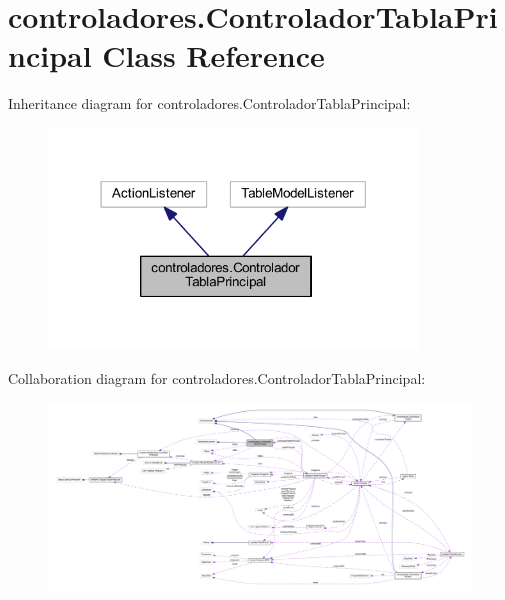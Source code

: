 \hypertarget{classcontroladores_1_1_controlador_tabla_principal}{}\section{controladores.\+Controlador\+Tabla\+Principal Class Reference}
\label{classcontroladores_1_1_controlador_tabla_principal}


Inheritance diagram for controladores.\+Controlador\+Tabla\+Principal\+:\nopagebreak
\begin{figure}[H]
\begin{center}
\leavevmode
\includegraphics[width=278pt]{classcontroladores_1_1_controlador_tabla_principal__inherit__graph}
\end{center}
\end{figure}


Collaboration diagram for controladores.\+Controlador\+Tabla\+Principal\+:\nopagebreak
\begin{figure}[H]
\begin{center}
\leavevmode
\includegraphics[width=350pt]{classcontroladores_1_1_controlador_tabla_principal__coll__graph}
\end{center}
\end{figure}
